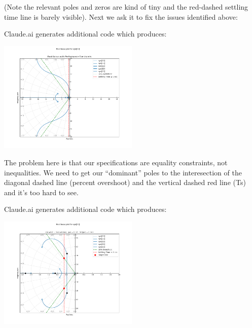 (Note the relevant poles and zeros are kind of tiny and the
red-dashed settling time line is barely visible). Next
we ask it to fix the issues identified above:




Claude.ai generates additional code which produces:

\includegraphics[width=0.5\textwidth]{figs09/ClaudeRL_V03.png}

The problem here is that our specifications are equality constraints, not
inequalities.  We need to get our ``dominant'' poles to the interesection
of the diagonal dashed line (percent overshoot) and the vertical
dashed red line (Ts) and it's too hard to see.



Claude.ai generates additional code which produces:

\includegraphics[width=0.5\textwidth]{figs09/ClaudeRL_V04.png}

